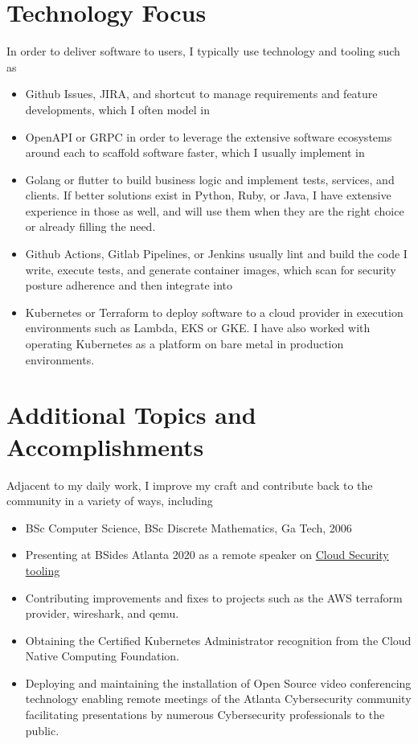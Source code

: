 \documentclass[letterpaper,11pt]{article}
\begin{document}
\section{Technology Focus}
In order to deliver software to users, I typically use technology and tooling such as
\begin{itemize}
	\setlength\itemsep{0.1em}
	\item Github Issues, JIRA, and shortcut to manage requirements and feature developments, which I often model in
	\item OpenAPI or GRPC in order to leverage the extensive software ecosystems around each to scaffold software faster, which I usually implement in
	\item Golang or flutter to build business logic and implement tests, services, and clients. If better solutions exist in Python, Ruby, or Java, I have extensive experience in those as well, and will use them when they are the right choice or already filling the need.
	\item Github Actions, Gitlab Pipelines, or Jenkins usually lint and build the code I write, execute tests, and generate container images, which scan for security posture adherence and then integrate into
	\item Kubernetes or Terraform to deploy software to a cloud provider in execution environments such as Lambda, EKS or GKE. I have also worked with operating Kubernetes as a platform on bare metal in production environments.
\end{itemize}

\section{Additional Topics and Accomplishments}
Adjacent to my daily work, I improve my craft and contribute back to the community in a variety of ways, including
\begin{itemize}
	\setlength\itemsep{0.1em}
	\item BSc Computer Science, BSc Discrete Mathematics, Ga Tech, 2006
	\item Presenting at BSides Atlanta 2020 as a remote speaker on \href{https://www.youtube.com/watch?v=kLCaAaUd1mM}{\color{blue}Cloud Security tooling}
	\item Contributing improvements and fixes to projects such as the AWS terraform provider, wireshark, and qemu.
	\item Obtaining the Certified Kubernetes Administrator recognition from the Cloud Native Computing Foundation.
	\item Deploying and maintaining the installation of Open Source video conferencing technology enabling remote meetings of the Atlanta Cybersecurity community facilitating presentations by numerous Cybersecurity professionals to the public.
\end{itemize}
\end{document}
